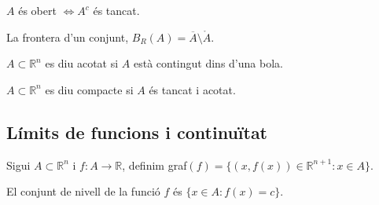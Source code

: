 \documentclass[../main.tex]{subfiles}
\begin{document}
    \begin{proposicio}
        $A$ és obert $\Longleftrightarrow A^c$ és tancat. 
    \end{proposicio}
    \begin{definicio}
        La frontera d'un conjunt, $B_R(A) = \overline{A} \setminus \mathring{A}$.
    \end{definicio}
    \begin{definicio}
        $A \subset \mathbb{R}^n$ es diu acotat si $A$ està contingut dins d'una bola.
    \end{definicio}
    \begin{definicio}
        $A \subset \mathbb{R}^n$ es diu compacte si $A$ és tancat i acotat.
    \end{definicio}
    \subsection{Límits de funcions i continuïtat}
    \begin{definicio}
        Sigui $A \subset \mathbb{R}^n$ i $f: A\rightarrow \mathbb{R}$, definim graf$(f) = \{(x, f(x)) \in \mathbb{R}^{n+1}: x\in A\}$.
    \end{definicio}
    \begin{definicio}
        El conjunt de nivell de la funció $f$ és $\{x \in A: f(x) = c\}$.
    \end{definicio}
\end{document}
